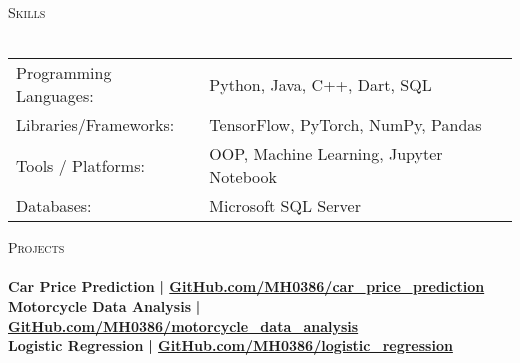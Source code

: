 \documentclass[a4paper]{article}
\newcommand{\lineunder} {
    \vspace*{-8pt} \\
    \hspace*{-18pt} \hrulefill \\
}
\newcommand{\header} [1] {
    {\hspace*{-18pt}\vspace*{6pt} \textsc{#1}}
    \vspace*{-6pt} \lineunder
}
\begin{document}
%
%
  \header{Skills}
  \vspace{2mm}
  \begin{longtable}{p{4cm}p{12cm}}
  Programming Languages: & Python, Java, C++, Dart, SQL \\
  Libraries/Frameworks: & TensorFlow, PyTorch, NumPy, Pandas \\
  Tools / Platforms: & OOP, Machine Learning, Jupyter Notebook \\
  Databases: & Microsoft SQL Server \\
  \end{longtable}
  \vspace{2mm}

      \header{Projects}
\vspace{2mm}
      {\textbf{Car Price Prediction}}\textbf{ | \href{https://github.com/MH0386/car\_price\_prediction}{GitHub.com/MH0386/car\_price\_prediction}}\\

\vspace*{1mm}
      {\textbf{Motorcycle Data Analysis}}\textbf{ | \href{https://github.com/MH0386/motorcycle\_data\_analysis}{GitHub.com/MH0386/motorcycle\_data\_analysis}}\\

\vspace*{1mm}
      {\textbf{Logistic Regression}}\textbf{ | \href{https://github.com/MH0386/logistic\_regression}{GitHub.com/MH0386/logistic\_regression}}\\

\vspace*{2mm}
\end{document}

